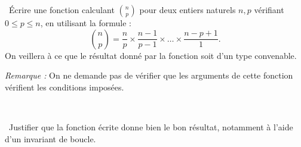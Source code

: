 \question\ Écrire une fonction  calculant $\displaystyle\binom{n}{p}$ pour deux entiers naturels $n,p$ vérifiant $0 \leq p \leq n$, en utilisant la formule :
    \begin{equation*}
      \binom{n}{p} = \dfrac{n}{p} \times \dfrac{n-1}{p-1} \times \dots \times \dfrac{n-p+1}{1}.
    \end{equation*}
    On veillera à ce que le résultat donné par la fonction  soit d'un type convenable. 
    
    \emph{Remarque :} On ne demande pas de vérifier que les arguments de cette fonction vérifient les conditions imposées. 

\medskip\    
    
\question\ Justifier que la fonction écrite donne bien le bon résultat, notamment à l'aide d'un invariant de boucle.  
